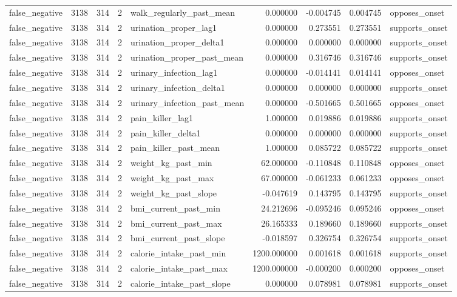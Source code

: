 \begin{longtable}{lrrrlrrrl}
false\_negative & 3138 & 314 & 2 & walk\_regularly\_past\_mean & 0.000000 & -0.004745 & 0.004745 & opposes\_onset \\
false\_negative & 3138 & 314 & 2 & urination\_proper\_lag1 & 0.000000 & 0.273551 & 0.273551 & supports\_onset \\
false\_negative & 3138 & 314 & 2 & urination\_proper\_delta1 & 0.000000 & 0.000000 & 0.000000 & supports\_onset \\
false\_negative & 3138 & 314 & 2 & urination\_proper\_past\_mean & 0.000000 & 0.316746 & 0.316746 & supports\_onset \\
false\_negative & 3138 & 314 & 2 & urinary\_infection\_lag1 & 0.000000 & -0.014141 & 0.014141 & opposes\_onset \\
false\_negative & 3138 & 314 & 2 & urinary\_infection\_delta1 & 0.000000 & 0.000000 & 0.000000 & supports\_onset \\
false\_negative & 3138 & 314 & 2 & urinary\_infection\_past\_mean & 0.000000 & -0.501665 & 0.501665 & opposes\_onset \\
false\_negative & 3138 & 314 & 2 & pain\_killer\_lag1 & 1.000000 & 0.019886 & 0.019886 & supports\_onset \\
false\_negative & 3138 & 314 & 2 & pain\_killer\_delta1 & 0.000000 & 0.000000 & 0.000000 & supports\_onset \\
false\_negative & 3138 & 314 & 2 & pain\_killer\_past\_mean & 1.000000 & 0.085722 & 0.085722 & supports\_onset \\
false\_negative & 3138 & 314 & 2 & weight\_kg\_past\_min & 62.000000 & -0.110848 & 0.110848 & opposes\_onset \\
false\_negative & 3138 & 314 & 2 & weight\_kg\_past\_max & 67.000000 & -0.061233 & 0.061233 & opposes\_onset \\
false\_negative & 3138 & 314 & 2 & weight\_kg\_past\_slope & -0.047619 & 0.143795 & 0.143795 & supports\_onset \\
false\_negative & 3138 & 314 & 2 & bmi\_current\_past\_min & 24.212696 & -0.095246 & 0.095246 & opposes\_onset \\
false\_negative & 3138 & 314 & 2 & bmi\_current\_past\_max & 26.165333 & 0.189660 & 0.189660 & supports\_onset \\
false\_negative & 3138 & 314 & 2 & bmi\_current\_past\_slope & -0.018597 & 0.326754 & 0.326754 & supports\_onset \\
false\_negative & 3138 & 314 & 2 & calorie\_intake\_past\_min & 1200.000000 & 0.001618 & 0.001618 & supports\_onset \\
false\_negative & 3138 & 314 & 2 & calorie\_intake\_past\_max & 1200.000000 & -0.000200 & 0.000200 & opposes\_onset \\
false\_negative & 3138 & 314 & 2 & calorie\_intake\_past\_slope & 0.000000 & 0.078981 & 0.078981 & supports\_onset \\
\end{longtable}
